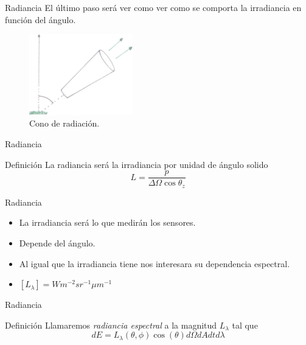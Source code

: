 \documentclass[]{article}
\begin{document}
\begin{frame}{Radiancia}
  El último paso será ver como ver como se comporta la irradiancia en función del ángulo.
  \begin{figure}
    \includegraphics[width=0.4\textwidth]{imagenes/radiancia.png}
    \caption{Cono de radiación.}
  \end{figure}
\end{frame}

\begin{frame}{Radiancia}
  \begin{block}{Definición}
    La radiancia será la irradiancia por unidad de ángulo solido
    \begin{equation}
      L = \frac{p}{\Delta \Omega \cos\theta_z}
    \end{equation}
  \end{block}
\end{frame}

\begin{frame}{Radiancia}
  \begin{itemize}[<+>]
    \item La irradiancia será lo que medirán los sensores.
    \item Depende del ángulo.
    \item Al igual que la irradiancia tiene nos interesara su dependencia espectral.
    \item $[L_\lambda] = W m^{-2} sr^{-1} \mu m^{-1}$
  \end{itemize}
\end{frame}

\begin{frame}{Radiancia}
  \begin{block}{Definición}
    Llamaremos \emph{radiancia espectral} a la magnitud $L_\lambda$ tal que
    \begin{equation}
      dE = L_{\lambda}(\theta,\phi) \cos(\theta) d\Omega dA dt d\lambda
    \end{equation}
  \end{block}
\end{frame}
\end{document}
